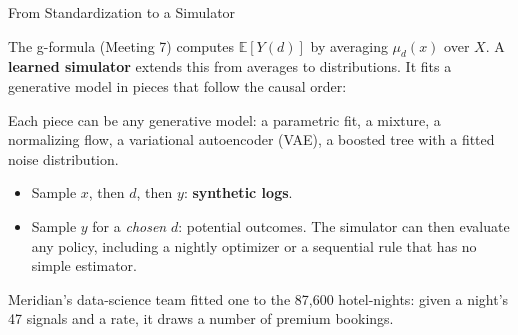 \documentclass[aspectratio=169, 11pt, handout]{beamer}
\newcommand{\E}{\mathbb{E}}
\begin{document}
\begin{frame}{From Standardization to a Simulator}

The g-formula (Meeting 7) computes $\E[Y(d)]$ by averaging $\mu_d(x)$ over $X$. A \textbf{learned simulator} extends this from averages to distributions. It fits a generative model in pieces that follow the causal order:

\begin{center}
\end{center}

Each piece can be any generative model: a parametric fit, a mixture, a normalizing flow, a variational autoencoder (VAE), a boosted tree with a fitted noise distribution.

\begin{itemize}
  \item Sample $x$, then $d$, then $y$: \textbf{synthetic logs}.
  \item Sample $y$ for a \emph{chosen} $d$: potential outcomes. The simulator can then evaluate any policy, including a nightly optimizer or a sequential rule that has no simple estimator.
\end{itemize}

\medskip

Meridian's data-science team fitted one to the 87{,}600 hotel-nights: given a night's 47 signals and a rate, it draws a number of premium bookings.
\end{frame}
\end{document}
